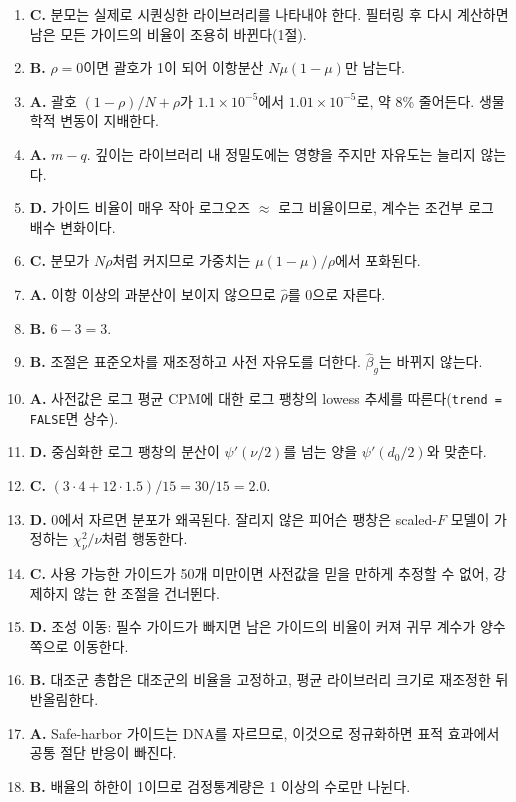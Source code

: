 \documentclass[11pt]{article}
\begin{document}
\begin{enumerate}[label=\textbf{Q\arabic*.},leftmargin=2.6em,itemsep=5pt]
\item \textbf{C.} 분모는 실제로 시퀀싱한 라이브러리를 나타내야 한다. 필터링 후
다시 계산하면 남은 모든 가이드의 비율이 조용히 바뀐다(1절).
\item \textbf{B.} $\rho=0$이면 괄호가 1이 되어 이항분산 $N\mu(1-\mu)$만 남는다.
\item \textbf{A.} 괄호 $(1-\rho)/N+\rho$가 $1.1\times10^{-5}$에서
$1.01\times10^{-5}$로, 약 8\% 줄어든다. 생물학적 변동이 지배한다.
\item \textbf{A.} $m-q$. 깊이는 라이브러리 내 정밀도에는 영향을 주지만 자유도는
늘리지 않는다.
\item \textbf{D.} 가이드 비율이 매우 작아 로그오즈 $\approx$ 로그 비율이므로,
계수는 조건부 로그 배수 변화이다.
\item \textbf{C.} 분모가 $N\rho$처럼 커지므로 가중치는 $\mu(1-\mu)/\rho$에서
포화된다.
\item \textbf{A.} 이항 이상의 과분산이 보이지 않으므로 $\hat\rho$를 0으로 자른다.
\item \textbf{B.} $6-3=3$.
\item \textbf{B.} 조절은 표준오차를 재조정하고 사전 자유도를 더한다.
$\hat\beta_g$는 바뀌지 않는다.
\item \textbf{A.} 사전값은 로그 평균 CPM에 대한 로그 팽창의 lowess 추세를
따른다(\texttt{trend = FALSE}면 상수).
\item \textbf{D.} 중심화한 로그 팽창의 분산이 $\psi'(\nu/2)$를 넘는 양을
$\psi'(d_0/2)$와 맞춘다.
\item \textbf{C.} $(3\cdot4+12\cdot1.5)/15=30/15=2.0$.
\item \textbf{D.} 0에서 자르면 분포가 왜곡된다. 잘리지 않은 피어슨 팽창은
scaled-$F$ 모델이 가정하는 $\chi^2_\nu/\nu$처럼 행동한다.
\item \textbf{C.} 사용 가능한 가이드가 50개 미만이면 사전값을 믿을 만하게
추정할 수 없어, 강제하지 않는 한 조절을 건너뛴다.
\item \textbf{D.} 조성 이동: 필수 가이드가 빠지면 남은 가이드의 비율이 커져
귀무 계수가 양수 쪽으로 이동한다.
\item \textbf{B.} 대조군 총합은 대조군의 비율을 고정하고, 평균 라이브러리
크기로 재조정한 뒤 반올림한다.
\item \textbf{A.} Safe-harbor 가이드는 DNA를 자르므로, 이것으로 정규화하면
표적 효과에서 공통 절단 반응이 빠진다.
\item \textbf{B.} 배율의 하한이 1이므로 검정통계량은 1 이상의 수로만 나뉜다.

\end{enumerate}
\end{document}
